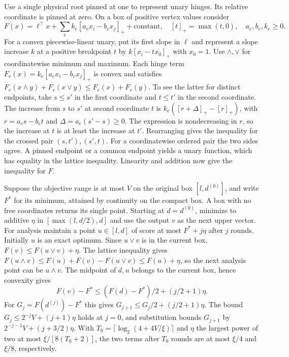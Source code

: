 \documentclass[11pt]{article}
\begin{document}
Use a single physical root pinned at one to represent unary hinges. Its relative coordinate is pinned at zero. On a box of positive vertex values consider
\[
 F(x)=\ell^\top x+\sum_e k_e[a_e x_i-b_e x_j]_+ +\mathrm{constant},
 \quad [t]_+=\max(t,0),\quad a_e,b_e,k_e\ge0 .
\]
For a convex piecewise-linear unary, put its first slope in \(\ell\) and represent a slope increase \(k\) at a positive breakpoint \(t\) by \(k[x_i-tx_0]_+\) with \(x_0=1\). Use \(\wedge,\vee\) for coordinatewise minimum and maximum. Each hinge term \(F_e(x)=k_e[a_ex_i-b_ex_j]_+\) is convex and satisfies \(F_e(x\wedge y)+F_e(x\vee y)\le F_e(x)+F_e(y)\). To see the latter for distinct endpoints, take \(s\le s'\) in the first coordinate and \(t\le t'\) in the second coordinate. The increase from \(s\) to \(s'\) at second coordinate \(t\) is \(k_e([r+\Delta]_+-[r]_+)\), with \(r=a_es-b_et\) and \(\Delta=a_e(s'-s)\ge0\). The expression is nondecreasing in \(r\), so the increase at \(t\) is at least the increase at \(t'\). Rearranging gives the inequality for the crossed pair \((s,t'),(s',t)\). For a coordinatewise ordered pair the two sides agree. A pinned endpoint or a common endpoint yields a unary function, which has equality in the lattice inequality. Linearity and addition now give the inequality for \(F\).

Suppose the objective range is at most \(V\) on the original box \([l,d^{(0)}]\), and write \(F^*\) for its minimum, attained by continuity on the compact box. A box with no free coordinates returns its single point. Starting at \(d=d^{(0)}\), minimize to additive \(\eta\) in \([\max(l,d/2),d]\) and use the output \(v\) as the next upper vector. For analysis maintain a point \(u\in[l,d]\) of score at most \(F^*+j\eta\) after \(j\) rounds. Initially \(u\) is an exact optimum. Since \(u\vee v\) is in the current box, \(F(v)\le F(u\vee v)+\eta\). The lattice inequality gives \(F(u\wedge v)\le F(u)+F(v)-F(u\vee v)\le F(u)+\eta\), so the next analysis point can be \(u\wedge v\). The midpoint of \(d,u\) belongs to the current box, hence convexity gives
\[
 F(v)-F^*\le (F(d)-F^*)/2+(j/2+1)\eta .
\]
For \(G_j=F(d^{(j)})-F^*\) this gives \(G_{j+1}\le G_j/2+(j/2+1)\eta\). The bound \(G_j\le 2^{-j}V+(j+1)\eta\) holds at \(j=0\), and substitution bounds \(G_{j+1}\) by \(2^{-j-1}V+(j+3/2)\eta\). With \(T_0=\lceil\log_2(4+4V/\xi)\rceil\) and \(\eta\) the largest power of two at most \(\xi/[8(T_0+2)]\), the two terms after \(T_0\) rounds are at most \(\xi/4\) and \(\xi/8\), respectively.
\end{document}
